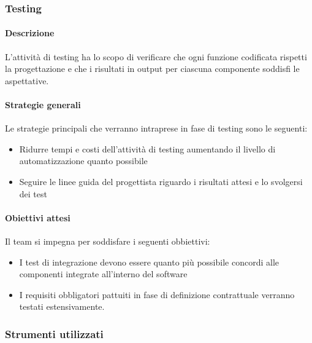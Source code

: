 	\subsubsection{Testing}
	\paragraph{Descrizione}
	L'attività di testing ha lo scopo di verificare che ogni funzione codificata rispetti la progettazione e che i risultati in output per ciascuna componente soddisfi le aspettative.
	
	\paragraph{Strategie generali}
	Le strategie principali che verranno intraprese in fase di testing sono le seguenti:
	
	\begin{itemize}
		\item Ridurre tempi e costi dell'attività di testing aumentando il livello di automatizzazione quanto possibile
		\item Seguire le linee guida del progettista riguardo i risultati attesi e lo svolgersi dei test
	\end{itemize}
	
	\paragraph{Obiettivi attesi}
	Il team si impegna per soddisfare i seguenti obbiettivi:
	
	\begin{itemize}
		\item I test di integrazione devono essere quanto più possibile concordi alle componenti integrate all'interno del software
		\item I requisiti obbligatori pattuiti in fase di definizione contrattuale verranno testati estensivamente.
	\end{itemize}

	\subsubsection{Strumenti utilizzati}
